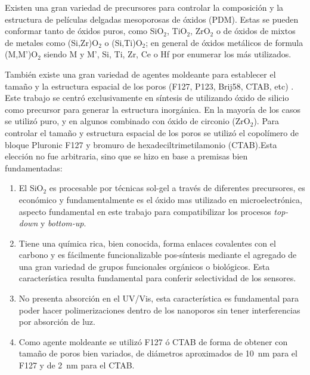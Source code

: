 	Existen una gran variedad de precursores para controlar la composición y la estructura de películas delgadas mesoporosas de óxidos (PDM). Estas se pueden conformar tanto de óxidos puros, como SiO$_2$, TiO$_2$, ZrO$_2$ o de óxidos de mixtos de metales como (Si,Zr)O$_2$ o (Si,Ti)O$_2$; en general de óxidos metálicos de formula (M,M')O$_2$ siendo M y M', Si, Ti, Zr, Ce o Hf por enumerar los más utilizados.

	También existe una gran variedad de agentes moldeante para establecer el tamaño y la estructura espacial de los poros (F127, P123, Brij58, CTAB, etc) \cite{angelome2011,schuth2013,Soler-Illia2006,Soler-Illia2002a}. Este trabajo se centró exclusivamente en síntesis de \pdm\space utilizando óxido de silicio como precursor para generar la estructura inorgánica. En la mayoría de los casos se utilizó puro, y en algunos combinado con óxido de circonio (ZrO$_2$). Para controlar el tamaño y estructura espacial de los poros se utilizó el copolímero de bloque Pluronic F127 y bromuro de hexadeciltrimetilamonio (CTAB).Esta elección no fue arbitraria, sino que se hizo en base a premisas bien fundamentadas:
		
		\begin{enumerate}

		\item El SiO$_2$ es procesable por técnicas sol-gel a través de diferentes precursores, es económico y fundamentalmente es el óxido mas utilizado en microelectrónica, aspecto fundamental en este trabajo para compatibilizar los procesos \textit{top-down} y \textit{bottom-up}.

		\item Tiene una química rica, bien conocida, forma enlaces covalentes con el carbono y es fácilmente funcionalizable pos-síntesis mediante el agregado de una gran variedad de grupos funcionales orgánicos o biológicos. Esta característica resulta fundamental para conferir selectividad de los sensores.

		\item No presenta absorción en el UV/Vis, esta característica es fundamental para poder hacer polimerizaciones dentro de los nanoporos sin tener interferencias por absorción de luz.

		\item Como agente moldeante se utilizó F127 ó CTAB de forma de obtener \pdm\space con tamaño de poros bien variados, de diámetros aproximados de \SI{10}{\nm} para el F127 y de \SI{2}{\nm} para el CTAB.

		\end{enumerate}
	
